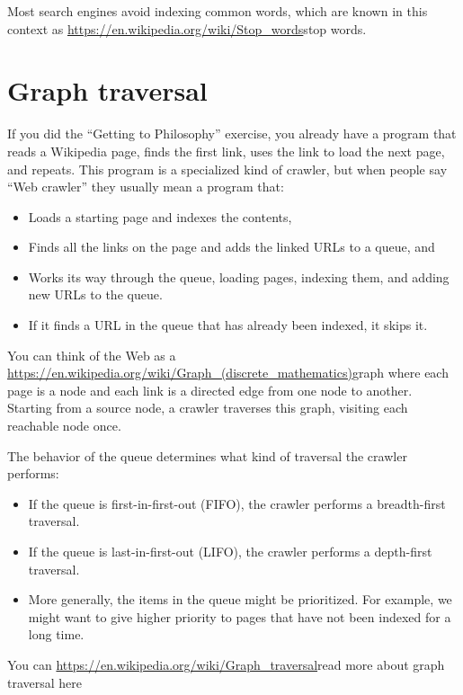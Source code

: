 \documentclass[12pt]{book}
\theoremstyle{exercise}
\begin{document}
Most search engines avoid indexing common words, which are known in this
context as \url{https://en.wikipedia.org/wiki/Stop_words}{stop words}.

\section{Graph traversal}\label{graph-traversal}

If you did the ``Getting to Philosophy'' exercise, you already have a program
that reads a Wikipedia page, finds the first link, uses the link to load
the next page, and repeats. This program is a specialized kind of
crawler, but when people say ``Web crawler'' they usually mean a program
that:

\begin{itemize}
\item
  Loads a starting page and indexes the contents,
\item
  Finds all the links on the page and adds the linked URLs to a queue,
  and
\item
  Works its way through the queue, loading pages, indexing them, and
  adding new URLs to the queue.
\item
  If it finds a URL in the queue that has already been indexed, it skips
  it.
\end{itemize}

You can think of the Web as a
\url{https://en.wikipedia.org/wiki/Graph_(discrete_mathematics)}{graph}
where each page is a node and each link is a directed edge from one node
to another. Starting from a source node, a crawler traverses this graph,
visiting each reachable node once.

The behavior of the queue determines what kind of traversal the crawler
performs:

\begin{itemize}
\item
  If the queue is first-in-first-out (FIFO), the crawler performs a
  breadth-first traversal.
\item
  If the queue is last-in-first-out (LIFO), the crawler performs a
  depth-first traversal.
\item
  More generally, the items in the queue might be prioritized. For
  example, we might want to give higher priority to pages that have not
  been indexed for a long time.
\end{itemize}

You can \url{https://en.wikipedia.org/wiki/Graph_traversal}{read more
about graph traversal here}
\end{document}
